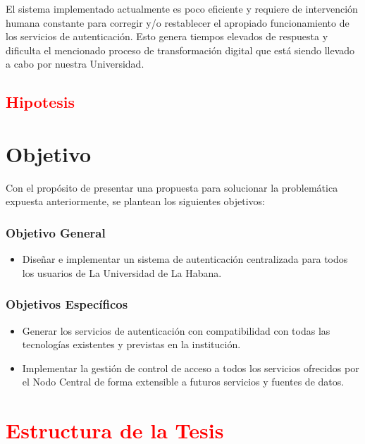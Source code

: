 El sistema implementado actualmente es poco eficiente y requiere de intervención humana constante para corregir y/o restablecer el apropiado funcionamiento de los servicios de autenticación. Esto genera tiempos elevados de respuesta y dificulta el mencionado proceso de transformación digital que está siendo llevado a cabo por nuestra Universidad.

\textcolor{red}{\section*{Hipotesis}}

\section*{Objetivo}
Con el propósito de presentar una propuesta para solucionar la problemática expuesta anteriormente, se plantean los siguientes objetivos:

\subsubsection*{Objetivo General}

\begin{itemize}	
	\item Diseñar e implementar un sistema de autenticación centralizada para todos los usuarios de La Universidad de La Habana. 
\end{itemize}

\subsubsection*{Objetivos Específicos}
\begin{itemize}	
	\item Generar los servicios de autenticación con compatibilidad con todas las tecnologías existentes y previstas en la institución.
	\item Implementar la gestión de control de acceso a todos los servicios ofrecidos por el Nodo Central de forma extensible a futuros servicios y fuentes de datos.
\end{itemize}

\section*{\textcolor{red}{Estructura de la Tesis}}
